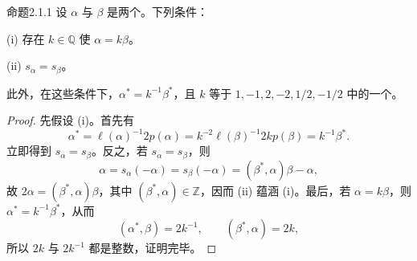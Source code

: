 \begin{SGAresult}{命题}{2.1.1}
设 $\alpha$ 与 $\beta$ 是两个。下列条件：

(i) 存在 $k\in\mathbb Q$ 使 $\alpha=k\beta$。

(ii) $s_\alpha=s_\beta$。

此外，在这些条件下，$\alpha^*=k^{-1}\beta^*$，且 $k$ 等于 $1,-1,2,-2,1/2,-1/2$ 中的一个。
\end{SGAresult}
\begin{proof}
先假设 (i)。首先有
\[\alpha^*=\ell(\alpha)^{-1}2p(\alpha)=k^{-2}\ell(\beta)^{-1}2kp(\beta)=k^{-1}\beta^*.\]
立即得到 $s_\alpha=s_\beta$。反之，若 $s_\alpha=s_\beta$，则
\[\alpha=s_\alpha(-\alpha)=s_\beta(-\alpha)=(\beta^*,\alpha)\beta-\alpha,\]
故 $2\alpha=(\beta^*,\alpha)\beta$，其中 $(\beta^*,\alpha)\in\mathbb Z$，因而 (ii) 蕴涵 (i)。最后，若 $\alpha=k\beta$，则 $\alpha^*=k^{-1}\beta^*$，从而
\[(\alpha^*,\beta)=2k^{-1},\qquad(\beta^*,\alpha)=2k,\]
所以 $2k$ 与 $2k^{-1}$ 都是整数，证明完毕。
\end{proof}

